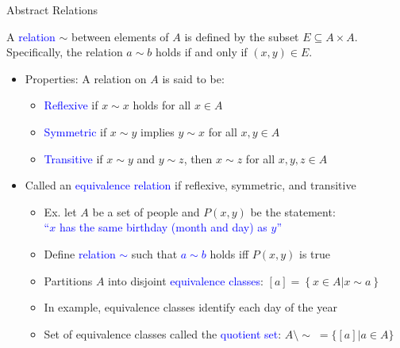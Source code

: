 \documentclass[10pt,english]{beamer}
\begin{document}
\begin{frame}{Abstract Relations}

\vspace{3mm}
\begin{definition}
A \textcolor{blue}{relation} $\sim$ between elements of $A$ is defined by the subset $E \subseteq A\times A$.  Specifically, the relation $a \sim b$ holds if and only if $(x,y)\in E$.
\end{definition}
\vspace{-5mm}

\begin{itemize}
\setlength\itemsep{3mm}
\item<1-> Properties: A relation on $A$ is said to be: \vspace{1mm}
\begin{itemize}
  \setlength\itemsep{1.5mm}
  \item \textcolor{blue}{Reflexive} if $x\sim x$ holds for all $x\in A$
  \item \textcolor{blue}{Symmetric} if $x\sim y$ implies $y\sim x$ for all $x,y\in A$
  \item \textcolor{blue}{Transitive} if $x\sim y$ and $y\sim z$, then $x\sim z$ for all $x,y,z\in A$
\end{itemize}

\item<2-> Called an \textcolor{blue}{equivalence relation} if reflexive, symmetric, and transitive \vspace{1mm}

\begin{itemize}
  \setlength\itemsep{1.5mm}
  \item Ex. let $A$ be a set of people and $P(x,y)$ be the statement: \\ \textcolor{blue}{``$x$ has the same birthday (month and day) as $y$''}
  \item Define \textcolor{blue}{relation $\sim$} such that \textcolor{blue}{$a\sim b$} holds iff $P(x,y)$ is true
  \item Partitions $A$ into disjoint \textcolor{blue}{equivalence classes}: $[a] = \left\{x\in A | x \sim a\right\}$
  \item In example, equivalence classes identify each day of the year
  \item Set of equivalence classes called the \textcolor{blue}{quotient set}: $A \setminus \!\sim \;= \{ [a] | a\in A \}$

\end{itemize}
\end{itemize}
\end{frame}
\end{document}

